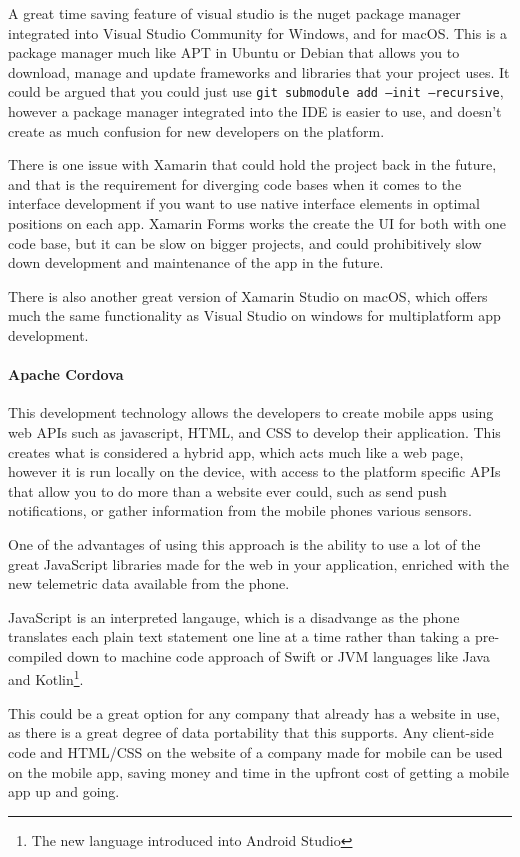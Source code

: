 \documentclass{scrreprt}
\begin{document}
A great time saving feature of visual studio is the nuget package manager integrated into Visual Studio Community for Windows, and for macOS. This is a package manager much like APT in Ubuntu or Debian that allows you to download, manage and update frameworks and libraries that your project uses. It could be argued that you could just use \texttt{git submodule add --init --recursive}, however a package manager integrated into the IDE is easier to use, and doesn't create as much confusion for new developers on the platform.

There is one issue with Xamarin that could hold the project back in the future, and that is the requirement for diverging code bases when it comes to the interface development if you want to use native interface elements in optimal positions on each app. Xamarin Forms works the create the UI for both with one code base, but it can be slow on bigger projects, and could prohibitively slow down development and maintenance of the app in the future.

There is also another great version of Xamarin Studio on macOS, which offers much the same functionality as Visual Studio on windows for multiplatform app development.

\paragraph{Apache Cordova}

This development technology allows the developers to create mobile apps using web APIs such as javascript, HTML, and CSS to develop their application. This creates what is considered a hybrid app, which acts much like a web page, however it is run locally on the device, with access to the platform specific APIs that allow you to do more than a website ever could, such as send push notifications, or gather information from the mobile phones various sensors.

One of the advantages of using this approach is the ability to use a lot of the great JavaScript libraries made for the web in your application, enriched with the new telemetric data available from the phone.

JavaScript is an interpreted langauge, which is a disadvange as the phone translates each plain text statement one line at a time rather than taking a pre-compiled down to machine code approach of Swift or JVM languages like Java and Kotlin\footnote{The new language introduced into Android Studio}.

This could be a great option for any company that already has a website in use, as there is a great degree of data portability that this supports. Any client-side code and HTML/CSS on the website of a company made for mobile can be used on the mobile app, saving money and time in the upfront cost of getting a mobile app up and going.
\end{document}
